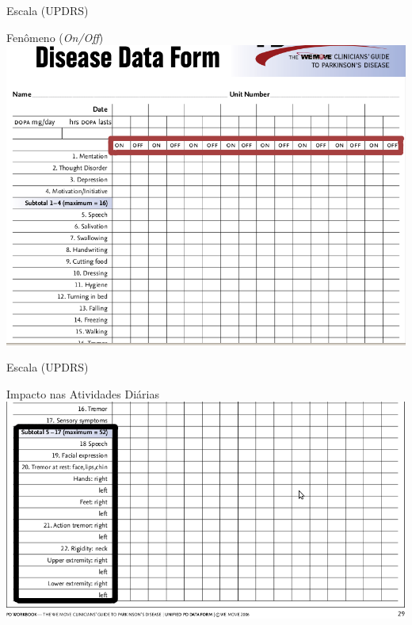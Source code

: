 \documentclass{beamer}
\begin{document}
\begin{frame}{Escala (UPDRS)} 
    \begin{block}{Fenômeno (\textit{On/Off})}
      \center \includegraphics[height=2.4 in]{img/updr1-sel.png}
    \end{block}		
\end{frame}

\begin{frame}{Escala (UPDRS)} 
    \begin{block}{Impacto nas Atividades Diárias}
      \center \includegraphics[height=2.0 in]{img/updr2-sel.png}
    \end{block}
\end{frame}
\end{document}
